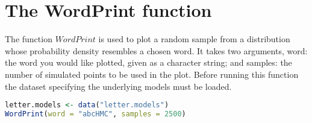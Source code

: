 \documentclass[10pt,a4paper,landscape]{article}
\begin{document}
\section{The WordPrint function}
The function $WordPrint$ is used to plot a random sample from a distribution
whose probability density resembles a chosen word. It takes two arguments,
word: the word you would like plotted, given as a character string; and samples:
the number of simulated points to be used in the plot. Before running this function the dataset specifying the underlying models must be loaded.

\begin{lstlisting}[backgroundcolor = \color{lightgray},
                   language = R,
                   framexleftmargin = 1em]
letter.models <- data("letter.models")
WordPrint(word = "abcHMC", samples = 2500)
\end{lstlisting}
\end{document}
